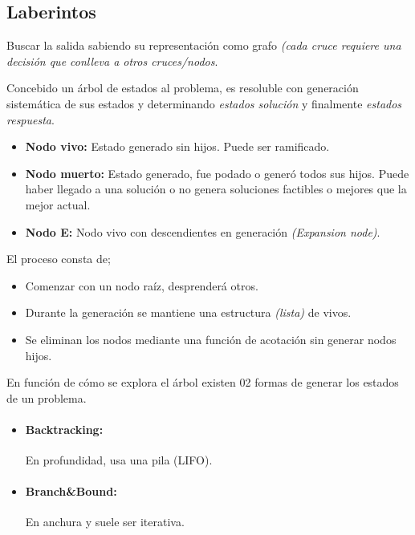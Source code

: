 \documentclass[tikz,11pt,fleqn]{book} %
\begin{document}
\subsection{Laberintos}
    Buscar la salida sabiendo su representación como grafo \textit{(cada cruce requiere una decisión que conlleva a otros cruces/nodos}.



\begin{theorem}
    Concebido un árbol de estados al problema, es resoluble con generación sistemática de sus estados y determinando \textit{estados solución} y finalmente \textit{estados respuesta}.
    \begin{itemize}
        \item \textbf{Nodo vivo:} Estado generado sin hijos. Puede ser ramificado.
        \item \textbf{Nodo muerto:} Estado generado, fue podado o generó todos sus hijos. Puede haber llegado a una solución o no genera soluciones factibles o mejores que la mejor actual.
        \item \textbf{Nodo E:} Nodo vivo con descendientes en generación \textit{(Expansion node)}.
    \end{itemize}
    El proceso consta de;
    \begin{itemize}
        \item Comenzar con un nodo raíz, desprenderá otros.
        \item Durante la generación se mantiene una estructura \textit{(lista)} de vivos.
        \item Se eliminan los nodos mediante una función de acotación sin generar nodos hijos. 
    \end{itemize}
\end{theorem}
    
En función de cómo se explora el árbol existen 02 formas de generar los estados de un problema.

\begin{itemize}
    \item \paragraph{Backtracking:} En profundidad, usa una pila (LIFO).
    \item \paragraph{Branch\&Bound:} En anchura y suele ser iterativa.
\end{itemize}
\end{document}
